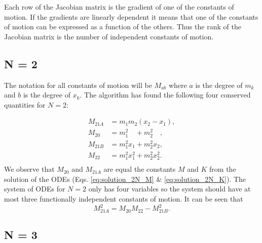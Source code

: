\documentclass[english,master]{liumaiex}
\theoremstyle{plain}
\theoremstyle{definition}
\begin{document}
Each row of the Jacobian matrix is the gradient of one of the constants of motion. If the gradients are linearly dependent it means that one of the constants of motion can be expressed as a function of the others. Thus the rank of the Jacobian matrix is the number of independent constants of motion.


\subsection*{N = 2}

The notation for all constants of motion will be $M_{ab}$ where $a$ is the degree of $m_k$ and $b$ is the degree of $x_k$. The algorithm has found the following four conserved quantities for $N = 2$:

\begin{align}
	M_{21A} &= m_1 m_2 (x_2 - x_1), \\
	M_{20\phantom{A}} &= m_1^2\phantom{x_1} + m_2^2\phantom{x_2}, \\
	M_{21B} &= m_1^2 x_1 + m_2^2 x_2, \\
	M_{22\phantom{A}} &= m_1^2 x_1^2 + m_2^2 x_2^2. \\
\end{align}
%
We observe that $M_{20}$ and $M_{21A}$ are equal the constants $M$ and $K$ from the solution of the ODEs (Eqs. \ref{eq:solution_2N_M} \& \ref{eq:solution_2N_K}).
%
The system of ODEs for $N = 2$ only has four variables so the system should have at most three functionally independent constants of motion. It can be seen that
\begin{equation}
	M_{21A}^2 = M_{20}M_{22} - M_{21B}^2.
\end{equation}

\subsection*{N = 3}
\end{document}
